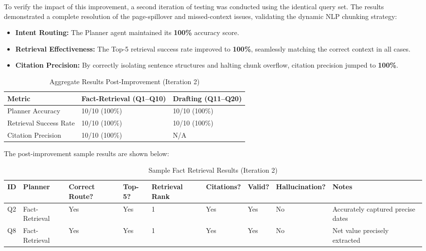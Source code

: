 \documentclass[11pt,a4paper]{article}
\begin{document}
To verify the impact of this improvement, a second iteration of testing was conducted using the identical query set. The results demonstrated a complete resolution of the page-spillover and missed-context issues, validating the dynamic NLP chunking strategy:

\begin{itemize}
\item \textbf{Intent Routing:} The Planner agent maintained its \textbf{100\%} accuracy score.
\item \textbf{Retrieval Effectiveness:} The Top-5 retrieval success rate improved to \textbf{100\%}, seamlessly matching the correct context in all cases.
\item \textbf{Citation Precision:} By correctly isolating sentence structures and halting chunk overflow, citation precision jumped to \textbf{100\%}.
\end{itemize}

\begin{table}[!ht]
    \centering
    \begin{tabular}{|l|l|l|}
    \hline
        Metric & Fact-Retrieval (Q1–Q10) & Drafting (Q11–Q20) \\ \hline
        Planner Accuracy & 10/10 (100\%) & 10/10 (100\%) \\ \hline
        Retrieval Success Rate & 10/10 (100\%) & 10/10 (100\%) \\ \hline
        Citation Precision & 10/10 (100\%) & N/A \\ \hline
    \end{tabular}
    \caption{Aggregate Results Post-Improvement (Iteration 2)}
\end{table}

The post-improvement sample results are shown below:

\begin{table}[H]
    \centering
    \begin{tabularx}{\textwidth}{|l|l|X|X|X|X|X|X|X|}
    \hline
      ID & Planner & Correct Route? & Top-5? & Retrie\-val Rank & Cita\-tions? & Valid? & Hal\-lu\-ci\-na\-tion? & Notes \\ \hline
        Q2 & Fact-Retrieval & Yes & Yes & 1 & Yes & Yes & No & Accurately captured precise dates \\ \hline
        Q8 & Fact-Retrieval & Yes & Yes & 1 & Yes & Yes & No & Net value precisely extracted \\ \hline
    \end{tabularx}
    \caption{Sample Fact Retrieval Results (Iteration 2)}
\end{table}
\end{document}
